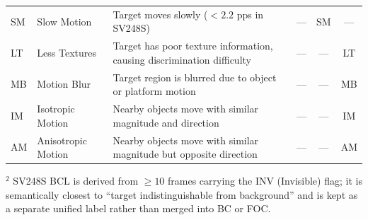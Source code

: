 \begin{table}[t]
\begin{tabular}{llp{7.4cm}ccc}
SM   & Slow Motion             & Target moves slowly ($<2.2$ pps in SV248S)                               & --- & SM  & --- \\
LT   & Less Textures           & Target has poor texture information, causing discrimination difficulty   & --- & --- & LT  \\
MB   & Motion Blur             & Target region is blurred due to object or platform motion                & --- & --- & MB  \\
IM   & Isotropic Motion        & Nearby objects move with similar magnitude and direction                 & --- & --- & IM  \\
AM   & Anisotropic Motion      & Nearby objects move with similar magnitude but opposite direction        & --- & --- & AM  \\
\bottomrule
\end{tabular}

\vspace{2pt}
\begin{flushleft}\footnotesize
$^{2}$ SV248S BCL is derived from $\geq 10$ frames carrying the INV (Invisible) flag;
it is semantically closest to ``target indistinguishable from background'' and is kept
as a separate unified label rather than merged into BC or FOC.
\end{flushleft}
\end{table}
